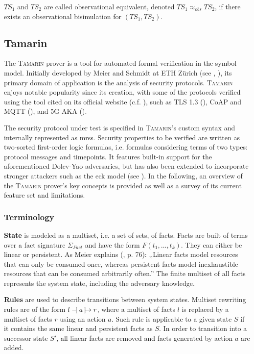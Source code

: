 \noindent
$TS_1$ and $TS_2$ are called observational equivalent, denoted $TS_1 \approx_{obs} TS_2$, if there exists an observational bisimulation for $(TS_1, TS_2)$.

\subsection{Tamarin}
\label{ssec:tamarin}

The \textsc{Tamarin} prover is a tool for automated formal verification in the symbol model.
Initially developed by Meier and Schmidt at ETH Zürich (see \cite{schmidt2012formal}, \cite{meier2013advancing}), its primary domain of application is the analysis of security protocols.
\textsc{Tamarin} enjoys notable popularity since its creation, with some of the protocols verified using the tool cited on its official website (c.f. \cite{tamarin}), such as TLS 1.3 (\cite{cremers2017comprehensive}), CoAP and MQTT (\cite{kim2017automated}), and 5G AKA (\cite{basin2018formal}).

The security protocol under test is specified in \textsc{Tamarin}'s custom syntax and internally represented as \glspl{mrs}.
Security properties to be verified are written as two-sorted first-order logic formulas, i.e. formulas considering terms of two types: protocol messages and timepoints.
It features built-in support for the aforementioned Dolev-Yao adversaries, but has also been extended to incorporate stronger attackers such as the \gls{eck} model (see \cite{lamacchia2007stronger}).
In the following, an overview of the \textsc{Tamarin} prover's key concepts is provided as well as a survey of its current feature set and limitations.

\subsubsection{Terminology}

\textbf{State} is modeled as a multiset, i.e. a set of sets, of facts.
Facts are built of terms over a fact signature $\Sigma_{Fact}$ and have the form $F(t_1, \ldots, t_k)$.
They can either be linear or persistent.
As Meier explains (\cite{meier2013advancing}, p. 76): ,,Linear facts model resources that can only be consumed once, whereas persistent facts model inexhaustible resources that can be consumed arbitrarily often.''
The finite multiset of all facts represents the system state, including the adversary knowledge.

\textbf{Rules} are used to describe transitions between system states.
Multiset rewriting rules are of the form $l \tracerule{a} r$, where a multiset of facts $l$ is replaced by a multiset of facts $r$ using an action $a$.
Such rule is applicable to a given state $S$ if it contains the same linear and persistent facts as $S$.
In order to transition into a successor state $S'$, all linear facts are removed and facts generated by action $a$ are added.

